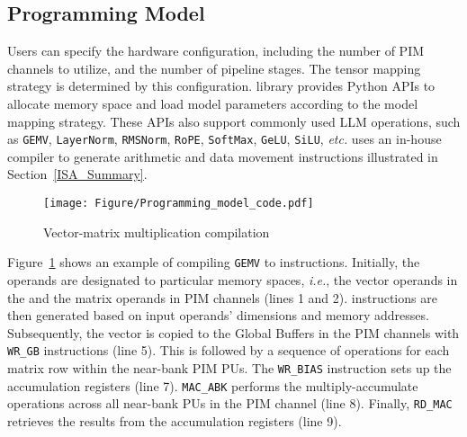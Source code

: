\subsection{Programming Model}

Users can specify the \att{} hardware configuration, including the number of PIM channels to utilize, and the number of pipeline stages. The tensor mapping strategy is determined by this configuration. \att{} library provides Python APIs to allocate memory space and load model parameters according to the model mapping strategy. 
These APIs also support commonly used LLM operations, such as \texttt{GEMV}, \texttt{LayerNorm}, \texttt{RMSNorm}, \texttt{RoPE}, \texttt{SoftMax}, \texttt{GeLU}, \texttt{SiLU}, \textit{etc.} 
\att{} uses an in-house compiler to generate arithmetic and data movement instructions illustrated in Section~\ref{ISA_Summary}. 


\begin{figure}[h]
    \centering
    \texttt{[image: Figure/Programming\_model\_code.pdf]}
    \caption{Vector-matrix multiplication compilation}
    \label{fig:Programming_model_code}
\end{figure}

Figure~\ref{fig:Programming_model_code} shows an example of compiling \texttt{GEMV} to \att{} instructions. Initially, the operands are designated to particular memory spaces, \textit{i.e.}, the vector operands in the \rf{} and the matrix operands in PIM channels (lines 1 and 2). \att{} instructions are then generated based on input operands' dimensions and memory addresses. Subsequently, the vector is copied to the Global Buffers in the PIM channels with \texttt{WR\_GB} instructions (line 5). This is followed by a sequence of operations for each matrix row within the near-bank PIM PUs. The \texttt{WR\_BIAS} instruction sets up the accumulation registers (line 7). \texttt{MAC\_ABK} performs the multiply-accumulate operations across all near-bank PUs in the PIM channel (line 8). Finally, \texttt{RD\_MAC} retrieves the results from the accumulation registers (line 9).
